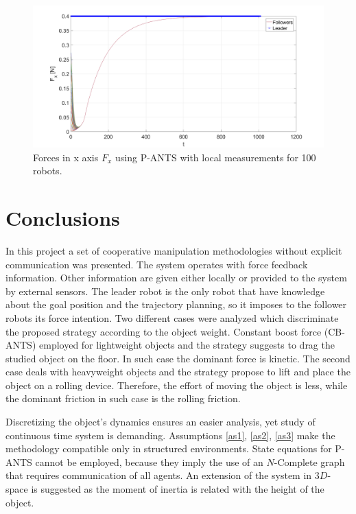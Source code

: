 \documentclass[letterpaper, 10 pt, conference]{ieeeconf}
\begin{document}
\begin{figure}[!h]
	\includegraphics[width=.53\textwidth]{figures/P_ANTS_Local_Fx_100.png}
	\centering
	\caption{Forces in x axis $F_x$ using P-ANTS with local measurements for 100 robots.}
	\label{fplfx1}
\end{figure}



\section{Conclusions}\label{concl}
In this project a set of cooperative manipulation methodologies without explicit communication was presented. The system operates with force feedback information. Other information are given either locally or provided to the system by external sensors. The leader robot is the only robot that have knowledge about the goal position and the trajectory planning, so it imposes to the follower robots its force intention. Two different cases were analyzed which discriminate the proposed strategy according to the object weight. Constant boost force (CB-ANTS) employed for lightweight objects and the strategy suggests to drag the studied object on the floor. In such case the dominant force is kinetic. The second case deals with heavyweight objects and the strategy propose to lift and place the object on a rolling device. Therefore, the effort of moving the object is less, while the dominant friction in such case is the rolling friction.

Discretizing the object's dynamics ensures an easier analysis, yet study of continuous time system is demanding. Assumptions \ref{as1}, \ref{as2}, \ref{as3} make the methodology compatible only in structured environments. State equations for P-ANTS cannot be employed, because they imply the use of an $N$-Complete graph that requires communication of all agents. An extension of the system in $3D$-space is suggested as the moment of inertia is related with the height of the object.



\end{document}
